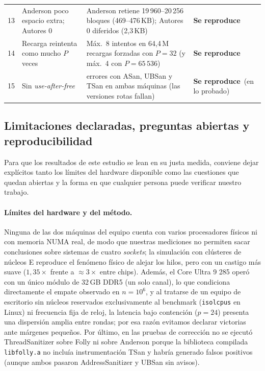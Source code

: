 \documentclass[11pt,a4paper]{article}
\newcommand{\si}{\textcolor{ok}{\textbf{Se reproduce}}}
\begin{document}
\begin{table}[H]
\begin{tabularx}{\linewidth}{@{}r >{\raggedright\arraybackslash}p{4.6cm} >{\raggedright\arraybackslash}X l@{}}
13 & Anderson poco espacio extra; Autores 0 & Anderson retiene 19\,960--20\,256 bloques (469--476\,KB); Autores 0 diferidos (2,3\,KB) & \si \\
14 & Recarga reintenta como mucho $P$ veces & Máx.\ 8 intentos en 64,4\,M recargas forzadas con $P=32$ (y máx.\ 4 con $P=65\,536$) & \si \\
15 & Sin \emph{use-after-free} & 0 errores con ASan, UBSan y TSan en ambas máquinas (las versiones rotas fallan) & \si\ (en lo probado) \\
\bottomrule
\end{tabularx}
\end{table}

\subsection{Limitaciones declaradas, preguntas abiertas y reproducibilidad}

Para que los resultados de este estudio se lean en su justa medida, conviene dejar explícitos tanto los límites del hardware disponible como las cuestiones que quedan abiertas y la forma en que cualquier persona puede verificar nuestro trabajo.

\paragraph{Límites del hardware y del método.}
Ninguna de las dos máquinas del equipo cuenta con varios procesadores físicos ni con memoria NUMA real, de modo que nuestras mediciones no permiten sacar conclusiones sobre sistemas de cuatro \emph{sockets}; la simulación con clústeres de núcleos E reproduce el fenómeno físico de alejar los hilos, pero con un castigo más suave ($1,35\times$ frente a $\approx 3\times$ entre chips). Además, el Core Ultra 9 285 operó con un único módulo de 32\,GB DDR5 (un solo canal), lo que condiciona directamente el empate observado en $n = 10^6$, y al tratarse de un equipo de escritorio sin núcleos reservados exclusivamente al benchmark (\texttt{isolcpus} en Linux) ni frecuencia fija de reloj, la latencia bajo contención ($p = 24$) presenta una dispersión amplia entre rondas; por esa razón evitamos declarar victorias ante márgenes pequeños. Por último, en las pruebas de corrección no se ejecutó ThreadSanitizer sobre Folly ni sobre Anderson porque la biblioteca compilada \texttt{libfolly.a} no incluía instrumentación TSan y habría generado falsos positivos (aunque ambos pasaron AddressSanitizer y UBSan sin avisos).
\end{document}
